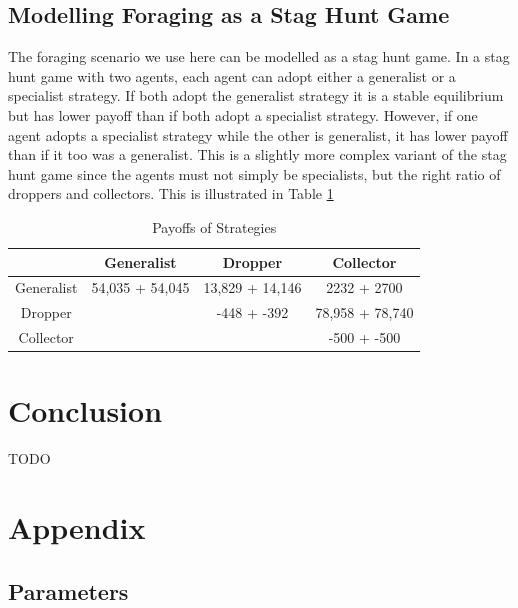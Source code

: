 \documentclass[12pt]{article}  %
\begin{document}
\subsection{Modelling Foraging as a Stag Hunt Game}

The foraging scenario we use here can be modelled as a stag hunt game.
In a stag hunt game with two agents, each agent can adopt either a generalist or a specialist strategy. 
If both adopt the generalist strategy it is a stable equilibrium but has lower payoff than if both adopt a specialist strategy.
However, if one agent adopts a specialist strategy while the other is generalist, it has lower payoff than if it too was a generalist.
This is a slightly more complex variant of the stag hunt game since the agents must not simply be specialists, but the right ratio of droppers and collectors. This is illustrated in Table \ref{tab:payoffs}\\

\begin{table}
\begin{center}
\begin{tabular}{ |c|c|c|c| } 
 \hline
  & Generalist & Dropper & Collector  \\ 
 \hline
 \hline
 Generalist & 54,035 + 54,045  & 13,829 + 14,146 & 2232 + 2700 \\ 
 \hline
 Dropper &  & -448 + -392 & 78,958 + 78,740 \\ 
 \hline
 Collector &  &  & -500 + -500 \\ 
 \hline
 \end{tabular}
\caption{\label{tab:payoffs}Payoffs of Strategies}
\end{center}
\end{table}


\section{Conclusion}

TODO




\section{Appendix}

\subsection{Parameters}
\end{document}
